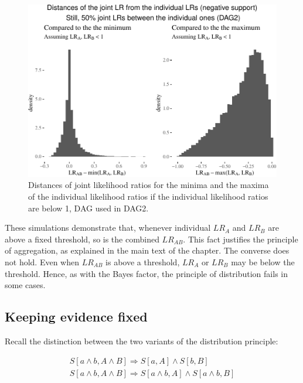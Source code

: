 \documentclass[
  10pt,
  dvipsnames,enabledeprecatedfontcommands]{scrartcl}
\begin{document}
\begin{figure}


\begin{center}\includegraphics[width=0.7\linewidth]{conjunction-appendix14_files/figure-latex/unnamed-chunk-25-1} \end{center}

\caption{Distances of joint likelihood ratios for the minima and the maxima of the individual likelihood ratios if the individual likelihood ratios are below 1, DAG used in \textsf{DAG2}.} 
\label{fig:LRlowerPlot2}
\end{figure}

\newpage

These simulations demonstrate that, whenever individual \(LR_A\) and
\(LR_B\) are above a fixed threshold, so is the combined \(LR_{AB}\).
This fact justifies the principle of aggregation, as explained in the
main text of the chapter. The converse does not hold. Even when
\(LR_{AB}\) is above a threshold, \(LR_A\) or \(LR_B\) may be below the
threshold. Hence, as with the Bayes factor, the principle of
distribution fails in some cases.

\hypertarget{keeping-evidence-fixed}{%
\subsection*{Keeping evidence fixed}\label{keeping-evidence-fixed}}

Recall the distinction between the two variants of the distribution
principle:

\begin{align}
S[a \wedge b, A\wedge B] \Rightarrow S[a, A] \wedge S[b, B] \tag{DIS1} \\
S[a \wedge b, A\wedge B] \Rightarrow S[a \wedge b, A] \wedge S[a\wedge b, B] \tag{DIS2}
\end{align}
\end{document}
